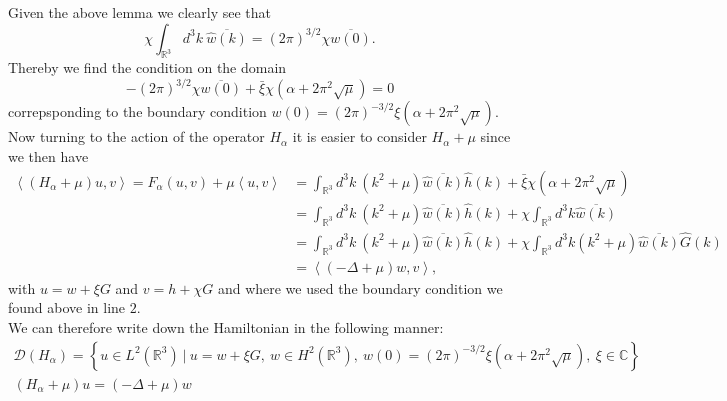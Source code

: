 \documentclass[a4paper,11pt]{article}
\newcommand{\dom}[1]{\mathscr D\left(#1\right)}
\renewcommand{\braket}[1]{\left\langle#1\right\rangle}
\newcommand{\R}{\mathbb{R}}
\newcommand{\C}{\mathbb{C}}
\numberwithin{equation}{section}
\begin{document}
Given the above lemma we clearly see that \begin{equation}
\chi\int_{\R^3} d^3k\ \overline{\hat{w}(k)}=(2\pi)^{3/2}\chi\overline{w(0)}.
\end{equation}
Thereby we find the condition on the domain\begin{equation}
-(2\pi)^{3/2}\chi\overline{w(0)}+\bar{\xi}\chi(\alpha+2\pi^2\sqrt{\mu})=0
\end{equation}
correpsponding to the boundary condition $ w(0)=(2\pi)^{-3/2}\xi(\alpha+2\pi^2\sqrt{\mu}) $. Now turning to the action of the operator $ H_\alpha $ it is easier to consider $ H_\alpha+\mu $ since we then have \begin{equation}
\begin{aligned}
\braket{(H_\alpha+\mu)u,v}=F_\alpha(u,v)+\mu\braket{u,v}&=\int_{\R^3} d^3k\ \left(k^2+\mu\right)\overline{\hat{w}(k)}\hat{h}(k)+\bar{\xi}\chi\left(\alpha+2\pi^2\sqrt{\mu}\right)\\
&=\int_{\R^3} d^3k\ \left(k^2+\mu\right)\overline{\hat{w}(k)}\hat{h}(k)+\chi\int_{\R^3}d^3k \overline{\hat{w}(k)}\\
&=\int_{\R^3} d^3k\ \left(k^2+\mu\right)\overline{\hat{w}(k)}\hat{h}(k)+\chi\int_{\R^3}d^3k(k^2+\mu) \overline{\hat{w}(k)}\hat{G}(k)\\
&=\braket{(-\Delta+\mu)w,v},
\end{aligned}
\end{equation}
with $ u=w+\xi G $ and $ v=h+\chi G $ and where we used the boundary condition we found above in line $ 2 $.\\
 We can therefore write down the Hamiltonian in the following manner:\begin{equation}
\begin{aligned}
\dom{H_\alpha}=\left\{ u\in L^2(\R^3)\ |\ u=w+\xi G,\ w\in H^2(\R^3),\ w(0)=(2\pi)^{-3/2}\xi(\alpha+2\pi^2\sqrt{\mu}),\ \xi\in\C \right\}\\
(H_\alpha+\mu)u=(-\Delta+\mu)w\qquad\qquad\qquad\qquad\qquad\qquad\qquad
\end{aligned}
\end{equation}
\end{document}
